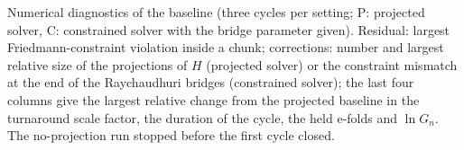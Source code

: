 \documentclass[pdflatex,sn-mathphys-num]{sn-jnl}
\begin{document}
\begin{tableorg}[htbp]\centering\footnotesize\setlength{\tabcolsep}{3pt}
\caption{Numerical diagnostics of the baseline (three cycles per setting; P: projected solver, C: constrained solver with the bridge parameter given). Residual: largest Friedmann-constraint violation inside a chunk; corrections: number and largest relative size of the projections of $H$ (projected solver) or the constraint mismatch at the end of the Raychaudhuri bridges (constrained solver); the last four columns give the largest relative change from the projected baseline in the turnaround scale factor, the duration of the cycle, the held e-folds and $\ln G_n$. The no-projection run stopped before the first cycle closed.}
\end{tableorg}
\end{document}
